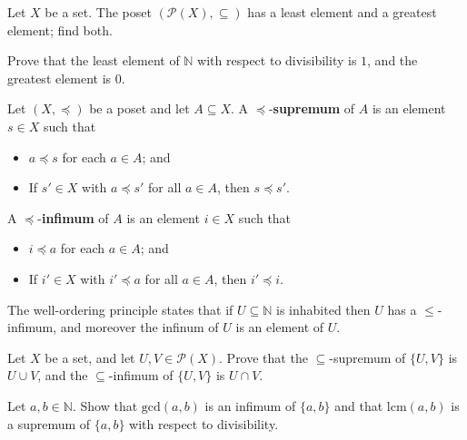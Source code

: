 \begin{exercise}
Let $X$ be a set. The poset $(\mathcal{P}(X), \subseteq)$ has a least element and a greatest element; find both.
\end{exercise}

\begin{exercise}
Prove that the least element of $\mathbb{N}$ with respect to divisibility is $1$, and the greatest element is $0$.
\end{exercise}

\begin{definition}[Supremum]
\label{defSupremumInfimum}
Let $(X, \preceq)$ be a poset and let $A \subseteq X$. A $\preceq$-\textbf{supremum} of $A$ is an element $s \in X$ such that
\begin{itemize}
\item $a \preceq s$ for each $a \in A$; and
\item If $s' \in X$ with $a \preceq s'$ for all $a \in A$, then $s \preceq s'$.
\end{itemize}
A $\preceq$-\textbf{infimum} of $A$ is an element $i \in X$ such that
\begin{itemize}
\item $i \preceq a$ for each $a \in A$; and
\item If $i' \in X$ with $i' \preceq a$ for all $a \in A$, then $i' \preceq i$.
\end{itemize}
\end{definition}

\begin{example}
The well-ordering principle states that if $U \subseteq \mathbb{N}$ is inhabited then $U$ has a $\le$-infimum, and moreover the infinum of $U$ is an element of $U$.
\end{example}

\begin{exercise}
Let $X$ be a set, and let $U,V \in \mathcal{P}(X)$. Prove that the $\subseteq$-supremum of $\{ U, V \}$ is $U \cup V$, and the $\subseteq$-infimum of $\{ U, V \}$ is $U \cap V$.
\end{exercise}

\begin{exercise}
Let $a,b \in \mathbb{N}$. Show that $\mathrm{gcd}(a,b)$ is an infimum of $\{ a, b \}$ and that $\mathrm{lcm}(a,b)$ is a supremum of $\{ a, b \}$ with respect to divisibility.
\end{exercise}

